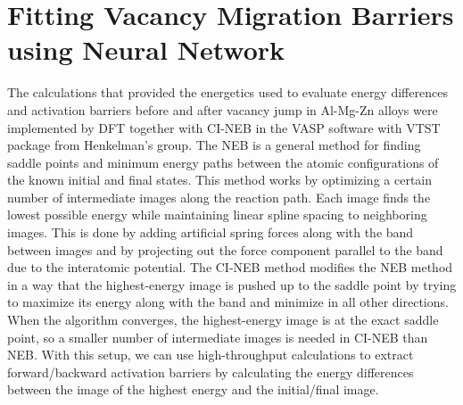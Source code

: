 \section{Fitting Vacancy Migration Barriers using Neural Network}
\label{Chap:Al/Vac:section:NN}

The calculations that provided the energetics used to evaluate energy differences and activation barriers before and after vacancy jump in Al-Mg-Zn alloys were implemented by \ac{DFT} together with \acf{CI-NEB} in the \ac{VASP} software with VTST package from Henkelman's group\cite{henkelman2000climbing,henkelman2000improved}. The \acf{NEB} is a general method for finding saddle points and minimum energy paths between the atomic configurations of the known initial and final states. This method works by optimizing a certain number of intermediate images along the reaction path. Each image finds the lowest possible energy while maintaining linear spline spacing to neighboring images. This is done by adding artificial spring forces along with the band between images and by projecting out the force component parallel to the band due to the interatomic potential. The \ac{CI-NEB} method modifies the \ac{NEB} method in a way that the highest-energy image is pushed up to the saddle point by trying to maximize its energy along with the band and minimize in all other directions. When the algorithm converges, the highest-energy image is at the exact saddle point, so a smaller number of intermediate images is needed in \ac{CI-NEB} than \ac{NEB}. With this setup, we can use high-throughput calculations to extract forward/backward activation barriers by calculating the energy differences between the image of the highest energy and the initial/final image.

